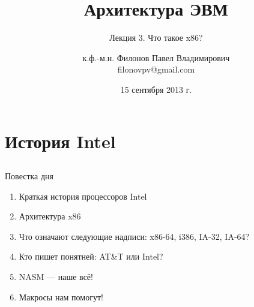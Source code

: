 \documentclass{beamer}
\title{Архитектура ЭВМ}
\subtitle{Лекция 3. Что такое x86?}
\author{к.ф.-м.н. Филонов Павел Владимирович \\ filonovpv@gmail.com}
\date{15 сентября 2013 г.}
\institute[МГТУ ГА] 
{
    Московский Государственный Технический Университет \\
    Гражданской Авиации
}
\begin{document}
    \frame{\titlepage}
    \section{История Intel}
    \subsection{}
    \begin{frame}{Повестка дня}
    	\begin{enumerate}
    	\pause
    	\item Краткая история процессоров Intel
    	\pause
    	\item Архитектура x86
    	\pause
    	\item Что означают следующие надписи: x86-64, i386, IA-32, IA-64?
    	\pause
    	\item Кто пишет понятней: AT\&T или Intel?
    	\pause
    	\item NASM --- наше всё!
    	\pause
    	\item Макросы нам помогут!
    	\end{enumerate}
    \end{frame}
\end{document}
